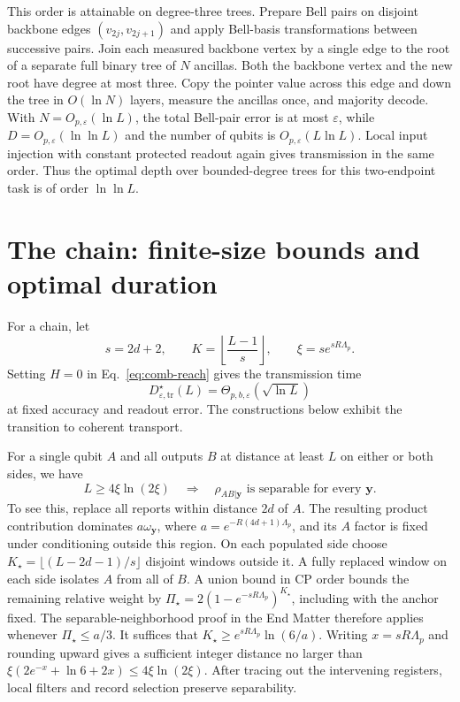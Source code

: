 \documentclass[aps,prl,twocolumn,superscriptaddress,longbibliography,reprint,floatfix]{revtex4-2}
\newcommand{\eps}{\varepsilon}
\newcommand{\Dopt}{D_{\eps,\mathrm{tr}}^{\star}}
\begin{document}
This order is attainable on degree-three trees.
Prepare Bell pairs on disjoint backbone edges $(v_{2j},v_{2j+1})$
and apply Bell-basis transformations between successive pairs.
Join each measured backbone vertex by a single edge to the root of a
separate full binary tree of $N$ ancillas. Both the backbone vertex and
the new root have degree at most three. Copy the pointer value across
this edge and down the tree in $O(\ln N)$ layers, measure the ancillas
once, and majority decode.
With $N=O_{p,\eps}(\ln L)$, the total Bell-pair error is at most
$\eps$, while $D=O_{p,\eps}(\ln\ln L)$ and the number of qubits is
$O_{p,\eps}(L\ln L)$.
Local input injection with constant protected readout again gives
transmission in the same order.
Thus the optimal depth over bounded-degree trees for this two-endpoint
task is of order $\ln\ln L$.

\FloatBarrier
\section{The chain: finite-size bounds and optimal duration}
\label{sm:time}

For a chain, let
\begin{equation}
 s=2d+2,\qquad K=\left\lfloor\frac{L-1}{s}\right\rfloor,
 \qquad \xi=s e^{sR\Lambda_p}.
 \label{eq:range-scale}
\end{equation}
Setting $H=0$ in
Eq.~\eqref{eq:comb-reach} gives the transmission time
\begin{equation}
 \Dopt(L)=\Theta_{p,b,\eps}(\sqrt{\ln L})
 \label{eq:time}
\end{equation}
at fixed accuracy and readout error. The constructions
below exhibit the transition to coherent transport.

For a single qubit $A$ and all outputs $B$ at distance at least $L$
on either or both sides, we have
\begin{equation}
 L\ge4\xi\ln(2\xi)
 \quad\Longrightarrow\quad \rho_{AB|\boldsymbol y}\text{ is separable for every }\boldsymbol y.
 \label{eq:strict-main}
\end{equation}
To see this, replace all reports within distance $2d$ of $A$.
The resulting product contribution dominates $a\omega_{\boldsymbol y}$, where
$a=e^{-R(4d+1)\Lambda_p}$, and its $A$ factor is fixed under
conditioning outside this region. On each populated side choose
$K_\star=\lfloor(L-2d-1)/s\rfloor$ disjoint windows outside it.
A fully replaced window on each side isolates $A$ from all of $B$.
A union bound in CP order bounds the remaining relative weight by
$\Pi_\star=2(1-e^{-sR\Lambda_p})^{K_\star}$, including with the
anchor fixed. The separable-neighborhood proof in the End Matter
therefore applies whenever $\Pi_\star\le a/3$.
It suffices that $K_\star\ge e^{sR\Lambda_p}\ln(6/a)$.
Writing $x=sR\Lambda_p$ and rounding upward gives a sufficient
integer distance no larger than
$\xi(2e^{-x}+\ln6+2x)\le4\xi\ln(2\xi)$.
After tracing out the intervening registers, local filters and record
selection preserve separability.
\end{document}
